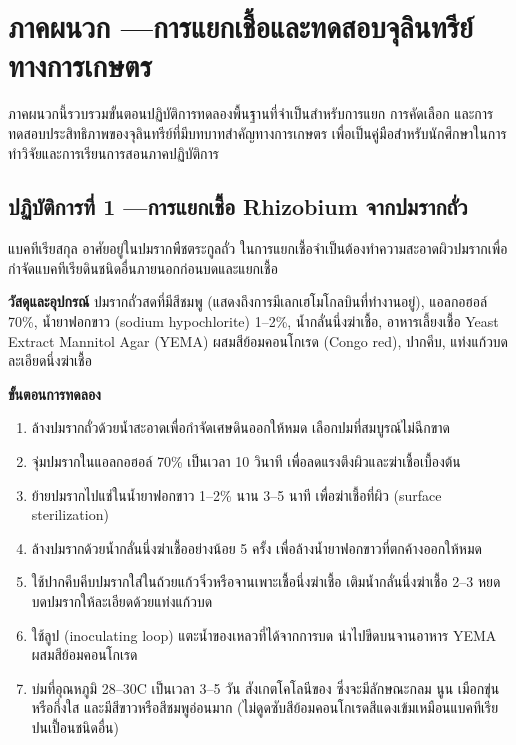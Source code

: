 \chapter{ภาคผนวก —การแยกเชื้อและทดสอบจุลินทรีย์ทางการเกษตร}
\label{ch:appendix_lab}

ภาคผนวกนี้รวบรวมขั้นตอนปฏิบัติการทดลองพื้นฐานที่จำเป็นสำหรับการแยก การคัดเลือก และการทดสอบประสิทธิภาพของจุลินทรีย์ที่มีบทบาทสำคัญทางการเกษตร เพื่อเป็นคู่มือสำหรับนักศึกษาในการทำวิจัยและการเรียนการสอนภาคปฏิบัติการ

\section{ปฏิบัติการที่ 1 —การแยกเชื้อ Rhizobium จากปมรากถั่ว}

แบคทีเรียสกุล  อาศัยอยู่ในปมรากพืชตระกูลถั่ว ในการแยกเชื้อจำเป็นต้องทำความสะอาดผิวปมรากเพื่อกำจัดแบคทีเรียดินชนิดอื่นภายนอกก่อนบดและแยกเชื้อ

\begin{labprotocol}
\textbf{วัสดุและอุปกรณ์} ปมรากถั่วสดที่มีสีชมพู (แสดงถึงการมีเลกเฮโมโกลบินที่ทำงานอยู่), แอลกอฮอล์ 70\%, น้ำยาฟอกขาว (sodium hypochlorite) 1--2\%, น้ำกลั่นนึ่งฆ่าเชื้อ, อาหารเลี้ยงเชื้อ Yeast Extract Mannitol Agar (YEMA) ผสมสีย้อมคอนโกเรด (Congo red), ปากคีบ, แท่งแก้วบดละเอียดนึ่งฆ่าเชื้อ

\textbf{ขั้นตอนการทดลอง}
\begin{enumerate}
    \item ล้างปมรากถั่วด้วยน้ำสะอาดเพื่อกำจัดเศษดินออกให้หมด เลือกปมที่สมบูรณ์ไม่ฉีกขาด
    \item จุ่มปมรากในแอลกอฮอล์ 70\% เป็นเวลา 10 วินาที เพื่อลดแรงตึงผิวและฆ่าเชื้อเบื้องต้น
    \item ย้ายปมรากไปแช่ในน้ำยาฟอกขาว 1--2\% นาน 3--5 นาที เพื่อฆ่าเชื้อที่ผิว (surface sterilization)
    \item ล้างปมรากด้วยน้ำกลั่นนึ่งฆ่าเชื้ออย่างน้อย 5 ครั้ง เพื่อล้างน้ำยาฟอกขาวที่ตกค้างออกให้หมด
    \item ใช้ปากคีบคีบปมรากใส่ในถ้วยแก้วจิ๋วหรือจานเพาะเชื้อนึ่งฆ่าเชื้อ เติมน้ำกลั่นนึ่งฆ่าเชื้อ 2--3 หยด บดปมรากให้ละเอียดด้วยแท่งแก้วบด
    \item ใช้ลูป (inoculating loop) แตะน้ำของเหลวที่ได้จากการบด นำไปขีดบนจานอาหาร YEMA ผสมสีย้อมคอนโกเรด
    \item บ่มที่อุณหภูมิ 28--30\degree C เป็นเวลา 3--5 วัน สังเกตโคโลนีของ  ซึ่งจะมีลักษณะกลม นูน เมือกขุ่นหรือกึ่งใส และมีสีขาวหรือสีชมพูอ่อนมาก (ไม่ดูดซับสีย้อมคอนโกเรดสีแดงเข้มเหมือนแบคทีเรียปนเปื้อนชนิดอื่น)
\end{enumerate}
\end{labprotocol}

